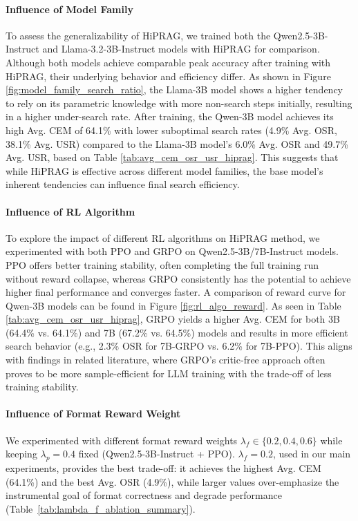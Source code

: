\documentclass{article}
\begin{document}
\paragraph{Influence of Model Family}
To assess the generalizability of HiPRAG, we trained both the Qwen2.5-3B-Instruct and Llama-3.2-3B-Instruct models with HiPRAG for comparison. Although both models achieve comparable peak accuracy after training with HiPRAG, their underlying behavior and efficiency differ. As shown in Figure \ref{fig:model_family_search_ratio}, the Llama-3B model shows a higher tendency to rely on its parametric knowledge with more non-search steps initially, resulting in a higher under-search rate. After training, the Qwen-3B model achieves its high Avg. CEM of 64.1\% with lower suboptimal search rates (4.9\% Avg. OSR, 38.1\% Avg. USR) compared to the Llama-3B model's 6.0\% Avg. OSR and 49.7\% Avg. USR, based on Table \ref{tab:avg_cem_osr_usr_hiprag}. This suggests that while HiPRAG is effective across different model families, the base model's inherent tendencies can influence final search efficiency.

\paragraph{Influence of RL Algorithm}
To explore the impact of different RL algorithms on HiPRAG method, we experimented with both PPO and GRPO on Qwen2.5-3B/7B-Instruct models. PPO offers better training stability, often completing the full training run without reward collapse, whereas GRPO consistently has the potential to achieve higher final performance and converges faster. A comparison of reward curve for Qwen-3B models can be found in Figure \ref{fig:rl_algo_reward}. As seen in Table \ref{tab:avg_cem_osr_usr_hiprag}, GRPO yields a higher Avg. CEM for both 3B (64.4\% vs. 64.1\%) and 7B (67.2\% vs. 64.5\%) models and results in more efficient search behavior (e.g., 2.3\% OSR for 7B-GRPO vs. 6.2\% for 7B-PPO). This aligns with findings in related literature, where GRPO's critic-free approach often proves to be more sample-efficient for LLM training with the trade-off of less training stability.

\paragraph{Influence of Format Reward Weight}
We experimented with different format reward weights $\lambda_f\in\{0.2,0.4,0.6\}$ while keeping $\lambda_p{=}0.4$ fixed (Qwen2.5-3B-Instruct + PPO). $\lambda_f{=}0.2$, used in our main experiments, provides the best trade-off: it achieves the highest Avg. CEM (64.1\%) and the best Avg. OSR (4.9\%), while larger values over-emphasize the instrumental goal of format correctness and degrade performance (Table~\ref{tab:lambda_f_ablation_summary}).
\end{document}

